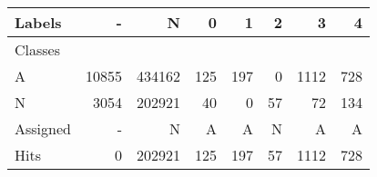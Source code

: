 \begin{tabular}{l|r|r|r|r|r|r|r}

Labels &      - &       N &    0 &    1 &   2 &     3 &    4 \\\hline
Classes  &        &         &      &      &     &       &      \\\hline
\hline
A        &  10855 &  434162 &  125 &  197 &   0 &  1112 &  728 \\\hline
N        &   3054 &  202921 &   40 &    0 &  57 &    72 &  134 \\\hline
\hline
Assigned &      - &       N &    A &    A &   N &     A &    A \\\hline
Hits     &      0 &  202921 &  125 &  197 &  57 &  1112 &  728 
\end{tabular}
